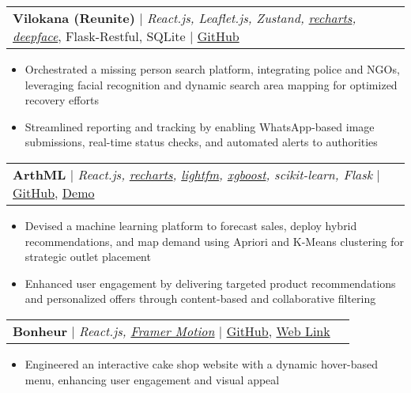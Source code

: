 \documentclass[letterpaper,10pt]{article}
\makeatletter
\newcommand{\resumeItem}[1]{
  \item\small{
    {#1 \vspace{-2pt}}
  }
}
\newcommand{\resumeProjectHeading}[2]{
    \item
    \begin{tabular*}{0.97\textwidth}{l@{\extracolsep{\fill}}r}
      #1 & \small\textit{#2} \\
    \end{tabular*}\vspace{-6pt}
}
\newcommand{\resumeItemListStart}{\begin{itemize}}
\newcommand{\resumeItemListEnd}{\end{itemize}\vspace{-5pt}}
\makeatother
\begin{document}
      \resumeProjectHeading {
            \textbf{Vilokana (Reunite)} 
            $|$ 
            \small
            {
                \emph{React.js, Leaflet.js, Zustand, \href{https://recharts.org/en-US/}{recharts}, \href{https://github.com/serengil/deepface}{deepface}}, Flask-Restful, SQLite
            }
            $|$ 
            \href{https://github.com/rushiijadhav23/Renuite-TSEC}{GitHub}
        }
        {}
        \resumeItemListStart
            \resumeItem {
                Orchestrated a missing person search platform, integrating police and NGOs, leveraging facial recognition and dynamic search area mapping for optimized recovery efforts
            }
            \resumeItem {
                Streamlined reporting and tracking by enabling WhatsApp-based image submissions, real-time status checks, and automated alerts to authorities
            }
        \resumeItemListEnd

        \resumeProjectHeading { 
            \textbf{ArthML} 
            $|$ 
            \small
            {
                \emph{React.js, \href{https://recharts.org/en-US/}{recharts}, \href{https://pypi.org/project/lightfm/}{lightfm}, \href{https://xgboost.readthedocs.io/en/latest/index.html}{xgboost}, scikit-learn, Flask} 
            }
            $|$ 
            \href{https://github.com/VaibhavKachare16/Datathon-25}{GitHub},       
            \href{https://youtu.be/6ZObIOhUAwg?si=pK84LRo0GXXktg2H}{Demo}      
        }
        {}
        \resumeItemListStart
            \resumeItem {
                Devised a machine learning platform to forecast sales, deploy hybrid recommendations, and map demand using Apriori and K-Means clustering for strategic outlet placement
            }
            \resumeItem {
                Enhanced user engagement by delivering targeted product recommendations and personalized offers through content-based and collaborative filtering
            }
        \resumeItemListEnd

        \resumeProjectHeading { 
            \textbf{Bonheur} 
            $|$ 
            \small {   
                \emph{React.js, \href{https://motion.dev/}{Framer Motion}}
            }
            $|$ 
            \href{https://github.com/rushiijadhav23/Bonheur-cake/}{GitHub}, \href{https://bonheur-cake.vercel.app/}{Web Link}
        }
        {}
        \resumeItemListStart
            \resumeItem {
                 Engineered an interactive cake shop website with a dynamic hover-based menu, enhancing user engagement and visual appeal
            }
        \resumeItemListEnd
\end{document}
